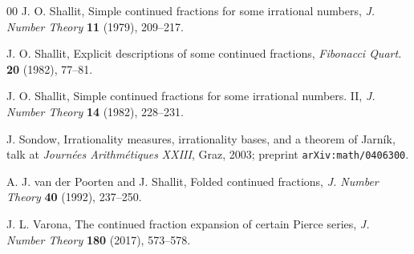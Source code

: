 \documentclass[10pt, a4paper]{amsart}
\numberwithin{equation}{section}
\theoremstyle{plain}
\theoremstyle{definition}
\begin{document}
\begin{thebibliography}{00}
J. O. Shallit, 
Simple continued fractions for some irrational numbers, 
\textit{J. Number Theory} \textbf{11} (1979), 209--217.

J. O. Shallit, 
Explicit descriptions of some continued fractions,
\textit{Fibonacci Quart.} \textbf{20} (1982), 77--81.

J. O. Shallit, 
Simple continued fractions for some irrational numbers. II, 
\textit{J. Number Theory} \textbf{14} (1982), 228--231.

J. Sondow, 
Irrationality measures, irrationality bases, and 
a theorem of Jarn\'{i}k, 
talk at \textit{Journ\'{e}es Arithm\'{e}tiques XXIII}, Graz, 2003; 
preprint \texttt{arXiv:math/0406300}.

A. J. van der Poorten and J. Shallit, 
Folded continued fractions, 
\textit{J. Number Theory} \textbf{40} (1992), 237--250.


J. L. Varona, 
The continued fraction expansion of certain Pierce series, 
\textit{J. Number Theory}
\textbf{180} (2017), 573--578.

\end{thebibliography}

\end{document}
